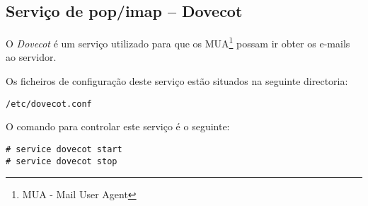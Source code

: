 \subsection{Serviço de pop/imap -- Dovecot}

O \emph{Dovecot} é um serviço utilizado para que os MUA\footnote{MUA - Mail User Agent} possam ir obter os e-mails ao servidor.

Os ficheiros de configuração deste serviço estão situados na seguinte directoria:

\begin{Verbatim}[commandchars=\\\{\}]
/etc/dovecot.conf
\end{Verbatim}

O comando para controlar este serviço é o seguinte:

\begin{Verbatim}[commandchars=\\\{\}]
# service dovecot start
# service dovecot stop
\end{Verbatim}

